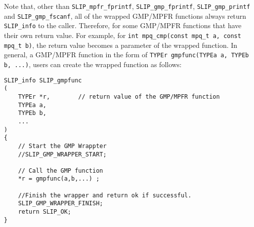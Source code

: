 \documentclass[12pt]{article}
\theoremstyle{definition}
\begin{document}
Note that, other than \verb|SLIP_mpfr_fprintf|, \verb|SLIP_gmp_fprintf|,
\verb|SLIP_gmp_printf| and \verb|SLIP_gmp_fscanf|, all of the wrapped GMP/MPFR
functions always return \verb|SLIP_info| to the caller. Therefore, for some
GMP/MPFR functions that have their own return value.  For example, for
\verb|int mpq_cmp(const mpq_t a, const mpq_t b)|, the return value becomes a
parameter of the wrapped function. In general, a GMP/MPFR function in the form
of \verb|TYPEr gmpfunc(TYPEa a, TYPEb b, ...)|, users can create the wrapped
function as follows:

\begin{mdframed}[userdefinedwidth=6in]
{\footnotesize
\begin{verbatim}
SLIP_info SLIP_gmpfunc
(
    TYPEr *r,        // return value of the GMP/MPFR function
    TYPEa a,
    TYPEb b,
    ...
)
{
    // Start the GMP Wrappter
    //SLIP_GMP_WRAPPER_START;

    // Call the GMP function
    *r = gmpfunc(a,b,...) ;

    //Finish the wrapper and return ok if successful.
    SLIP_GMP_WRAPPER_FINISH;
    return SLIP_OK;
}
\end{verbatim}
} \end{mdframed}
\end{document}
